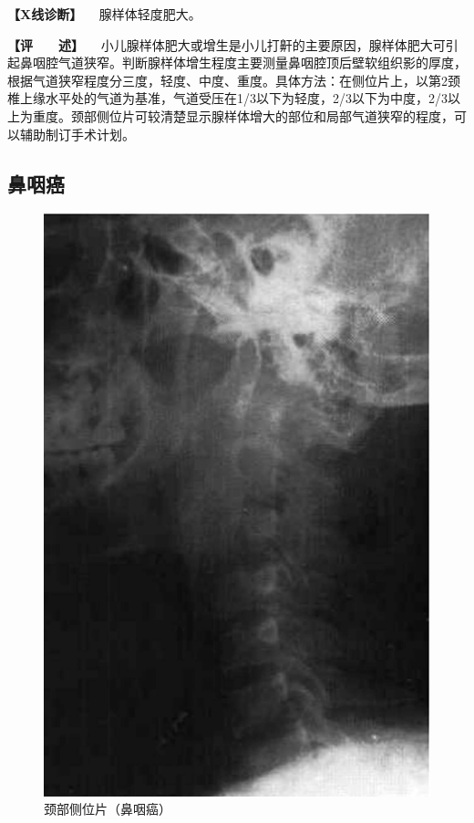 \textbf{【X线诊断】} 　腺样体轻度肥大。

\textbf{【评　　述】}
　小儿腺样体肥大或增生是小儿打鼾的主要原因，腺样体肥大可引起鼻咽腔气道狭窄。判断腺样体增生程度主要测量鼻咽腔顶后壁软组织影的厚度，根据气道狭窄程度分三度，轻度、中度、重度。具体方法：在侧位片上，以第2颈椎上缘水平处的气道为基准，气道受压在1/3以下为轻度，2/3以下为中度，2/3以上为重度。颈部侧位片可较清楚显示腺样体增大的部位和局部气道狭窄的程度，可以辅助制订手术计划。

\subsection{鼻咽癌}

\begin{figure}[!htbp]
 \centering
 \includegraphics{./images/Image00436.jpg}
 \captionsetup{justification=centering}
 \caption{颈部侧位片（鼻咽癌）}
 \label{fig7-5-3}
  \end{figure} 


